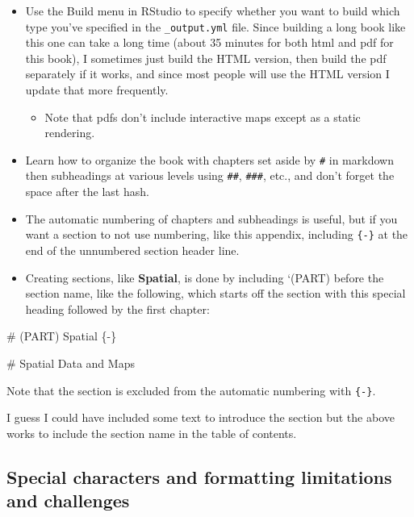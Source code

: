 \documentclass[
]{book}
\newenvironment{Shaded}{\begin{snugshade}}{\end{snugshade}}
\newcommand{\NormalTok}[1]{#1}
\providecommand{\tightlist}{%
  \setlength{\itemsep}{0pt}\setlength{\parskip}{0pt}}
\begin{document}
\begin{itemize}
\tightlist
\item
  Use the Build menu in RStudio to specify whether you want to build which type you've specified in the \texttt{\_output.yml} file. Since building a long book like this one can take a long time (about 35 minutes for both html and pdf for this book), I sometimes just build the HTML version, then build the pdf separately if it works, and since most people will use the HTML version I update that more frequently.

  \begin{itemize}
  \tightlist
  \item
    Note that pdfs don't include interactive maps except as a static rendering.
  \end{itemize}
\item
  Learn how to organize the book with chapters set aside by \texttt{\#} in markdown then subheadings at various levels using \texttt{\#\#}, \texttt{\#\#\#}, etc., and don't forget the space after the last hash.
\item
  The automatic numbering of chapters and subheadings is useful, but if you want a section to not use numbering, like this appendix, including \texttt{\{-\}} at the end of the unnumbered section header line.
\item
  Creating sections, like \textbf{Spatial}, is done by including `(PART) before the section name, like the following, which starts off the section with this special heading followed by the first chapter:
\end{itemize}

\begin{Shaded}
\begin{Highlighting}[]
\NormalTok{\# (PART) Spatial \{{-}\}}

\NormalTok{\# Spatial Data and Maps}

\NormalTok{\textasciigrave{}\textasciigrave{}\textasciigrave{}}
\end{Highlighting}
\end{Shaded}

Note that the section is excluded from the automatic numbering with \texttt{\{-\}}.

I guess I could have included some text to introduce the section but the above works to include the section name in the table of contents.

\hypertarget{special-characters-and-formatting-limitations-and-challenges}{%
\subsection{Special characters and formatting limitations and challenges}\label{special-characters-and-formatting-limitations-and-challenges}}
\end{document}
